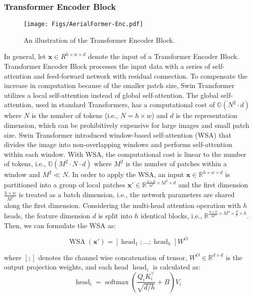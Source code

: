 \documentclass[journal]{IEEEtran}
\begin{document}
\subsubsection{Transformer Encoder Block}

\begin{figure}
    \centering
    \texttt{[image: Figs/AerialFormer-Enc.pdf]}
    \caption{An illustration of the Transformer Encoder Block. }
    \label{fig:enc_block}
\end{figure}

In general, let $\textbf{x} \in R^{h \times w \times d}$ denote the input of a Transformer Encoder Block. Transformer Encoder Block processes the input data with a series of self-attention and feed-forward network with residual connection. To compensate the increase in computation because of the smaller patch size, 
Swin Transformer \cite{liu2021swin} utilizes a local self-attention instead of global self-attention. The global self-attention, used in standard Transformers, has a computational cost of $\mathbb{O}(N^2\cdot d)$ where $N$ is the number of tokens (i.e., $N = h \times w$) and $d$ is the representation dimension, which can be prohibitively expensive for large images and small patch size. 
Swin Transformer introduced window-based self-attention (WSA) that divides the image into non-overlapping windows and performs self-attention within each window. With WSA, the computational cost is linear to the number of tokens, i.e., $\mathbb{O}(M^2\cdot N \cdot d)$ where $M^2$ is the number of patches within a window and $M^2 \ll N$. 
In order to apply the WSA, an input  $\mathbf{x} \in \mathbb{R}^{h\times w \times d}$ is partitioned into a group of local patches $\mathbf{x}' \in \mathbb{R}^{\frac{h\times w}{M^2} \times M^2 \times d}$ and the first dimension $\frac{h\times w}{M^2}$ is treated as a batch dimension, i.e., the network parameters are shared along the first dimension. 
Considering the multi-head attention operation with $h$ heads, the feature dimension $d$ is split into $h$ identical blocks, i.e., $\mathbb{R}^{\frac{h\times w}{M^2} \times M^2 \times \frac{d}{h} \times h}$. Then, we can formulate the WSA as:

\begin{equation}
    \operatorname{WSA}(\mathbf{x}') = [\operatorname{head}_{1}; \dots; \operatorname{head}_{h}] W^O
\end{equation}

where $[;]$ denotes the channel wise concatenation of tensor, $W^O \in \mathbb{R}^{d\times d}$ is the output projection weights, and each head $\operatorname{head}_i$ is calculated as:
\begin{equation}
    \operatorname{head}_{i} = \operatorname{softmax}\left(\frac{Q_iK_i^\top}{\sqrt{d/h}} + B\right)V_i
\end{equation}
\end{document}
